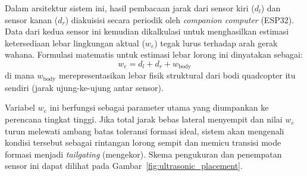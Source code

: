 \documentclass[12pt,a4paper]{report}
\numberwithin{equation}{chapter}
\begin{document}
Dalam arsitektur sistem ini, hasil pembacaan jarak dari sensor kiri ($d_l$\label{sym:dl}) dan sensor kanan ($d_r$\label{sym:dr}) diakuisisi secara periodik oleh \textit{companion computer} (ESP32). Data dari kedua sensor ini kemudian dikalkulasi untuk menghasilkan estimasi ketersediaan lebar lingkungan aktual ($w_e$\label{sym:we}) tegak lurus terhadap arah gerak wahana. Formulasi matematis untuk estimasi lebar lorong ini dinyatakan sebagai:
\begin{equation}
    w_e = d_l + d_r + w_{\text{body}}
\end{equation}
di mana $w_{\text{body}}$\label{sym:wbody} merepresentasikan lebar fisik struktural dari bodi quadcopter itu sendiri (jarak ujung-ke-ujung antar sensor). 

Variabel $w_e$ ini berfungsi sebagai parameter utama yang diumpankan ke perencana tingkat tinggi. Jika total jarak bebas lateral menyempit dan nilai $w_e$ turun melewati ambang batas toleransi formasi ideal, sistem akan mengenali kondisi tersebut sebagai rintangan lorong sempit dan memicu transisi mode formasi menjadi \textit{tailgating} (mengekor). Skema pengukuran dan penempatan sensor ini dapat dilihat pada Gambar~\ref{fig:ultrasonic_placement}.
\end{document}
